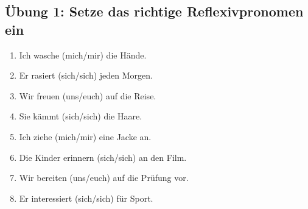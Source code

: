 \subsection*{Übung 1: Setze das richtige Reflexivpronomen ein}
\begin{enumerate}
    \item Ich wasche \underline{\hspace{1cm}} (mich/mir) die Hände.
    \item Er rasiert \underline{\hspace{1cm}} (sich/sich) jeden Morgen.
    \item Wir freuen \underline{\hspace{1cm}} (uns/euch) auf die Reise.
    \item Sie kämmt \underline{\hspace{1cm}} (sich/sich) die Haare.
    \item Ich ziehe \underline{\hspace{1cm}} (mich/mir) eine Jacke an.
    \item Die Kinder erinnern \underline{\hspace{1cm}} (sich/sich) an den Film.
    \item Wir bereiten \underline{\hspace{1cm}} (uns/euch) auf die Prüfung vor.
    \item Er interessiert \underline{\hspace{1cm}} (sich/sich) für Sport.
\end{enumerate}


\chapterend